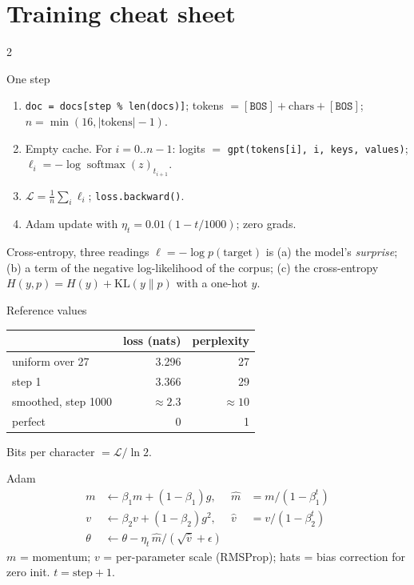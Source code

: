 \documentclass[10pt,letterpaper]{article}
\newcommand{\code}[1]{\lstinline[basicstyle=\ttfamily\small]|#1|}
\newcommand{\softmax}{\operatorname{softmax}}
\newcommand{\BOS}{\texttt{BOS}}
\newcounter{q}
\begin{document}
\clearpage
\section{Training cheat sheet}

\begin{multicols}{2}
\begin{cs}{One step}
\begin{enumerate}
  \item \texttt{doc = docs[step \% len(docs)]}; tokens $= [\BOS] + \text{chars} + [\BOS]$; $n=\min(16, |\text{tokens}|-1)$.
  \item Empty cache. For $i = 0..n-1$: logits $=$ \code{gpt(tokens[i], i, keys, values)}; $\ell_i = -\log\softmax(z)_{t_{i+1}}$.
  \item $\mathcal L = \frac1n\sum_i \ell_i$; \code{loss.backward()}.
  \item Adam update with $\eta_t = 0.01(1 - t/1000)$; zero grads.
\end{enumerate}
\end{cs}

\begin{cs}{Cross-entropy, three readings}
$\ell = -\log p(\text{target})$ is (a) the model's \emph{surprise}; (b) a term of the negative log-likelihood of the corpus; (c) the cross-entropy $H(y,p) = H(y) + \mathrm{KL}(y\|p)$ with a one-hot $y$.
\end{cs}

\begin{cs}{Reference values}
\begin{tabular}{@{}lrr@{}}
\toprule
& loss (nats) & perplexity \\
\midrule
uniform over 27 & 3.296 & 27 \\
step 1 & 3.366 & 29 \\
smoothed, step 1000 & $\approx 2.3$ & $\approx 10$ \\
perfect & 0 & 1 \\
\bottomrule
\end{tabular}

Bits per character $= \mathcal L/\ln 2$.
\end{cs}

\begin{cs}{Adam}
\begin{align*}
m &\leftarrow \beta_1 m + (1-\beta_1) g, & \hat m &= m/(1-\beta_1^{t}) \\
v &\leftarrow \beta_2 v + (1-\beta_2) g^2, & \hat v &= v/(1-\beta_2^{t}) \\
\theta &\leftarrow \theta - \eta_t\, \hat m/(\sqrt{\hat v}+\epsilon)
\end{align*}
$m$ = momentum; $v$ = per-parameter scale (RMSProp); hats = bias correction for zero init. $t = \text{step}+1$.
\end{cs}


\end{multicols}
\end{document}
